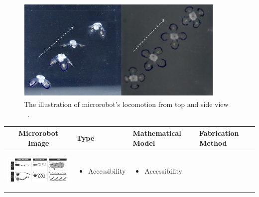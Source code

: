 \documentclass[a4paper,11pt]{article}
\begin{document}
\begin{sloppypar}
\begin{figure}
  \centering
    \includegraphics[width=0.9\textwidth]{jellyfish}
  \caption{ The illustration of microrobot\rq{}s locomotion from top and side view ~\citep{ko2012jellyfish}.}
  \label{jellyfish}
\end{figure}

\begin{table}[h!]
  \centering

\setlength{\arrayrulewidth}{.6mm}
\setlength{\tabcolsep}{5pt}
\renewcommand{\arraystretch}{.8}


  \begin{tabular}{ c  m{3cm}  m{3cm} m{3cm} }
    \hline
\rowcolor{lightgray}
    Microrobot Image & Type  & Mathematical Model & Fabrication Method \\ \hline\hline
    \begin{minipage}{.3\textwidth}
      \includegraphics[width=\linewidth, height=20mm]{cilia}
    \end{minipage}
    &
      \begin{itemize}
        \item Accessibility
    
      \end{itemize}
    & 
      \begin{itemize}
        \item Accessibility
   
      \end{itemize}
    \\ \hline


\end{tabular}
\end{table}
\end{sloppypar}
\end{document}
